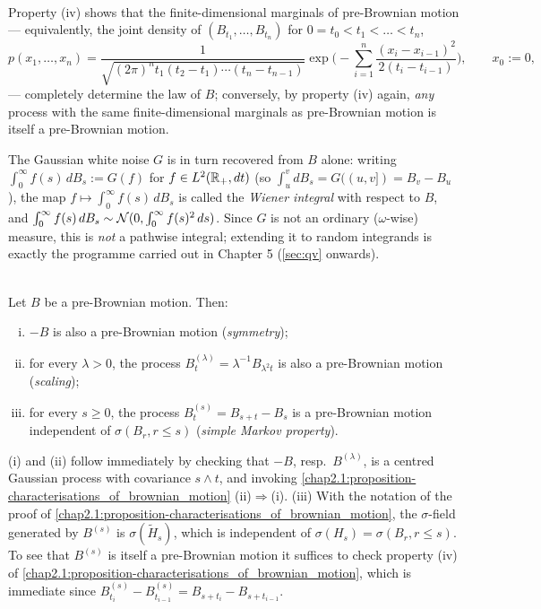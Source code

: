 \begin{remark} \label{chap2.1:remark-fdd_and_white_noise_from_pre_bm}  \\
Property (iv) shows that the finite-dimensional marginals of pre-Brownian motion --- equivalently, the joint density of $(B_{t_1},\dots,B_{t_n})$ for $0=t_0<t_1<\dots<t_n$,
$$p(x_1,\dots,x_n)=\frac{1}{\sqrt{(2\pi)^nt_1(t_2-t_1)\cdots(t_n-t_{n-1})}}\exp\Big(-\sum_{i=1}^n\frac{(x_i-x_{i-1})^2}{2(t_i-t_{i-1})}\Big),\qquad x_0:=0,$$
--- completely determine the law of $B$; conversely, by property (iv) again, \emph{any} process with the same finite-dimensional marginals as pre-Brownian motion is itself a pre-Brownian motion.

The Gaussian white noise $G$ is in turn recovered from $B$ alone: writing $\int_0^\infty f(s)\,dB_s:=G(f)$ for $f\in L^2(\mathbb{R}_+,dt)$ (so $\int_u^v dB_s=G((u,v])=B_v-B_u$), the map $f\mapsto\int_0^\infty f(s)\,dB_s$ is called the \textit{Wiener integral} with respect to $B$, and $\int_0^\infty f(s)\,dB_s\sim\mathcal{N}(0,\int_0^\infty f(s)^2\,ds)$. Since $G$ is not an ordinary ($\omega$-wise) measure, this is \emph{not} a pathwise integral; extending it to random integrands is exactly the programme carried out in Chapter 5 (\cref{sec:qv} onwards).
\end{remark}

\begin{proposition} \label{chap2.1:proposition-invariance_properties}  \\
Let $B$ be a pre-Brownian motion. Then:
\begin{enumerate}[(i)]
    \item $-B$ is also a pre-Brownian motion (\textit{symmetry});
    \item for every $\lambda>0$, the process $B^{(\lambda)}_t=\lambda^{-1}B_{\lambda^2t}$ is also a pre-Brownian motion (\textit{scaling});
    \item for every $s\ge0$, the process $B^{(s)}_t=B_{s+t}-B_s$ is a pre-Brownian motion independent of $\sigma(B_r,r\le s)$ (\textit{simple Markov property}).
\end{enumerate}
\end{proposition}
\begin{proofidea}
(i) and (ii) follow immediately by checking that $-B$, resp.\ $B^{(\lambda)}$, is a centred Gaussian process with covariance $s\wedge t$, and invoking \cref{chap2.1:proposition-characterisations_of_brownian_motion} (ii)$\Rightarrow$(i).
(iii) With the notation of the proof of \cref{chap2.1:proposition-characterisations_of_brownian_motion}, the $\sigma$-field generated by $B^{(s)}$ is $\sigma(\tilde H_s)$, which is independent of $\sigma(H_s)=\sigma(B_r,r\le s)$. To see that $B^{(s)}$ is itself a pre-Brownian motion it suffices to check property (iv) of \cref{chap2.1:proposition-characterisations_of_brownian_motion}, which is immediate since $B^{(s)}_{t_i}-B^{(s)}_{t_{i-1}}=B_{s+t_i}-B_{s+t_{i-1}}$.
\end{proofidea}

